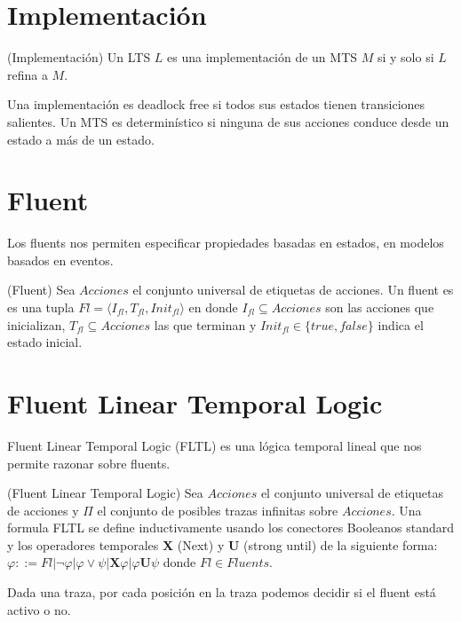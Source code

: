 \section{Implementación}

\begin{definition}{(Implementación)}
Un LTS $L$ es una implementación de un MTS $M$ si y solo si $L$ refina a $M$.
\end{definition}

Una implementación es deadlock free si todos sus estados tienen transiciones salientes.
Un MTS es determinístico si ninguna de sus acciones conduce desde un estado a más de un estado.

\section{Fluent}

Los fluents nos permiten especificar propiedades basadas en estados, en modelos basados en eventos.

\begin{definition}{(Fluent)}
Sea $Acciones$ el conjunto universal de etiquetas de acciones.
Un fluent es es una tupla $Fl = \langle I_{fl}, T_{fl}, Init_{fl} \rangle$ en donde $I_{fl} \subseteq Acciones$ son las acciones
que inicializan, $T_{fl} \subseteq Acciones$ las que terminan y $Init_{fl} \in \{true, false\}$ indica el estado inicial.
\end{definition}

\section{Fluent Linear Temporal Logic}
Fluent Linear Temporal Logic \cite{FLTL} (FLTL) es una lógica temporal lineal que nos permite razonar sobre fluents.

\begin{definition}{(Fluent Linear Temporal Logic)}
Sea $Acciones$ el conjunto universal de etiquetas de acciones y $\Pi$ el conjunto de posibles trazas infinitas sobre $Acciones$.
Una formula FLTL se define inductivamente usando los conectores Booleanos standard y los operadores temporales \textbf{X} (Next) y
\textbf{U} (strong until) de la siguiente forma:\\
$\varphi ::= Fl | \neg\varphi | \varphi \lor \psi | \textbf{X}\varphi | \varphi\textbf{U}\psi$ donde $Fl \in Fluents$.
\end{definition}

Dada una traza, por cada posición en la traza podemos decidir si el fluent está activo o no.

